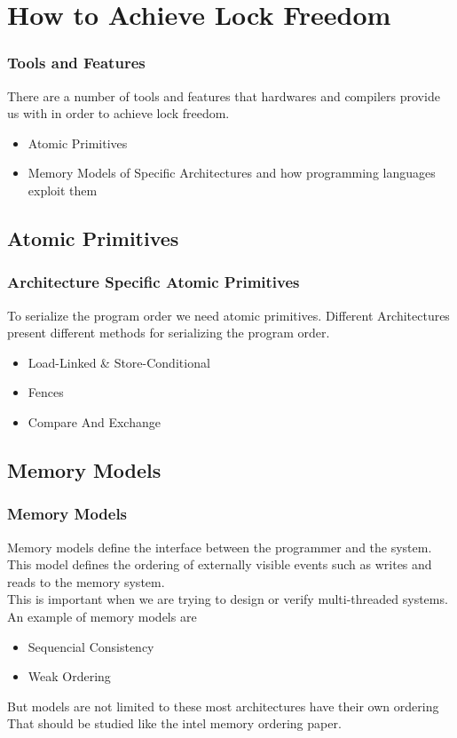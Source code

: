 \documentclass{beamer}
\begin{document}
\section{How to Achieve Lock Freedom}
\begin{frame}
    \frametitle{Tools and Features}
    There are a number of tools and features that hardwares and compilers
    provide us with in order to achieve lock freedom.
    \begin{itemize}
        \item Atomic Primitives
        \item Memory Models of Specific Architectures and how programming
            languages exploit them
    \end{itemize}
\end{frame}

\subsection{Atomic Primitives}
\begin{frame}
    \frametitle{Architecture Specific Atomic Primitives}
    To serialize the program order we need atomic primitives.
    Different Architectures present different methods for serializing the
    program order.
    \begin{itemize}
        \item Load-Linked \& Store-Conditional
        \item Fences
        \item Compare And Exchange
    \end{itemize}
\end{frame}

\subsection{Memory Models}
\begin{frame}
    \frametitle{Memory Models}
    Memory models define the interface between the programmer and the system.
    This model defines the ordering of externally visible events such as
    writes and reads to the memory system. \\
    This is important when we are trying to design or verify multi-threaded
    systems. \\
    An example of memory models are
    \begin{itemize}
        \item Sequencial Consistency
        \item Weak Ordering
    \end{itemize}
    But models are not limited to these most architectures have their own
    ordering That should be studied like the intel memory ordering paper.
\end{frame}
\end{document}

